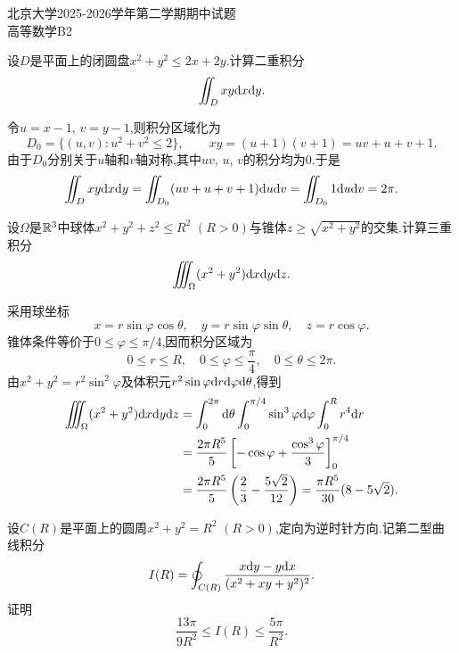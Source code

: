 \documentclass{ctexart}
\begin{document}
\pagestyle{empty}
\begin{center}\Large
    北京大学2025-2026学年第二学期期中试题\\
    高等数学B2
\end{center}
\begin{problem}[1.(10\songti{分})]
设$D$是平面上的闭圆盘$x^2+y^2\leqslant2x+2y$.计算二重积分
    \[\iint_Dxy\mathrm{d} x\mathrm{d} y.\]
\end{problem}
\begin{solution}
令$u=x-1$, $v=y-1$,则积分区域化为
\[D_0=\{(u,v):u^2+v^2\leqslant2\},\qquad xy=(u+1)(v+1)=uv+u+v+1.\]
由于$D_0$分别关于$u$轴和$v$轴对称,其中$uv$, $u$, $v$的积分均为$0$.于是
\[\iint_Dxy\mathrm{d} x\mathrm{d} y
=\iint_{D_0}(uv+u+v+1)\mathrm{d} u\mathrm{d} v
=\iint_{D_0}1\mathrm{d} u\mathrm{d} v=2\pi.\]
\end{solution}
\begin{problem}[2.(15\songti{分})]
设$\Omega$是$\mathbb{R}^3$中球体$x^2+y^2+z^2\leqslant R^2$ $(R>0)$与锥体$z\geqslant\sqrt{x^2+y^2}$的交集.计算三重积分
    \[\iiint_\Omega(x^2+y^2)\mathrm{d} x\mathrm{d} y\mathrm{d} z.\]
\end{problem}
\begin{solution}
采用球坐标
\[x=r\sin\varphi\cos\theta,\quad y=r\sin\varphi\sin\theta,\quad z=r\cos\varphi.\]
锥体条件等价于$0\leqslant\varphi\leqslant\pi/4$,因而积分区域为
\[0\leqslant r\leqslant R,\quad0\leqslant\varphi\leqslant\frac\pi4,\quad0\leqslant\theta\leqslant2\pi.\]
由$x^2+y^2=r^2\sin^2\varphi$及体积元$r^2\sin\varphi\mathrm{d} r\mathrm{d}\varphi\mathrm{d}\theta$,得到
\[\begin{aligned}
\iiint_\Omega(x^2+y^2)\mathrm{d} x\mathrm{d} y\mathrm{d} z
&=\int_0^{2\pi}\mathrm{d}\theta\int_0^{\pi/4}\sin^3\varphi\mathrm{d}\varphi
\int_0^Rr^4\mathrm{d} r\\
&=\frac{2\pi R^5}{5}\left[-\cos\varphi+\frac{\cos^3\varphi}{3}\right]_0^{\pi/4}\\
&=\frac{2\pi R^5}{5}\left(\frac23-\frac{5\sqrt2}{12}\right)
=\frac{\pi R^5}{30}(8-5\sqrt2).
\end{aligned}\]
\end{solution}
\begin{problem}[3.(15\songti{分})]
设$C(R)$是平面上的圆周$x^2+y^2=R^2$ $(R>0)$,定向为逆时针方向.记第二型曲线积分
    \[I(R)=\oint_{C(R)}\dfrac{x\mathrm{d} y-y\mathrm{d} x}{(x^2+xy+y^2)^2}.\]
    证明
    \[\dfrac{13\pi}{9R^2}\leqslant I(R)\leqslant\dfrac{5\pi}{R^2}.\]
\end{problem}
\end{document}
